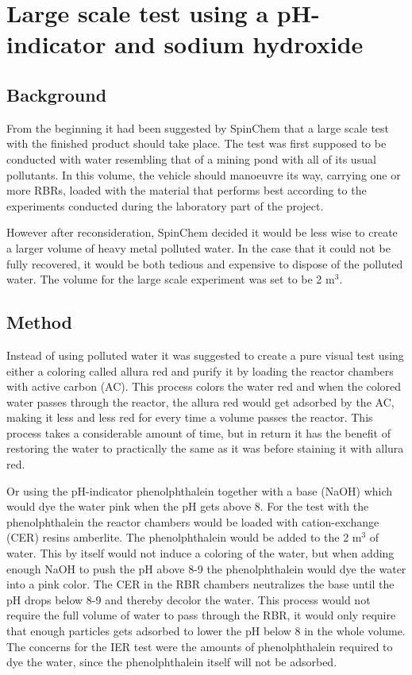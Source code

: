 \section{Large scale test using a pH-indicator and sodium hydroxide}

\subsection{Background}
From the beginning it had been suggested by SpinChem\textsuperscript{\textregistered} that a large scale test with the finished product should take place. The test was first supposed to be conducted with water resembling that of a mining pond with all of its usual pollutants. In this volume, the vehicle should manoeuvre its way, carrying one or more RBRs, loaded with the material that performs best according to the experiments conducted during the laboratory part of the project.

However after reconsideration, SpinChem\textsuperscript{\textregistered} decided it would be less wise to create a larger volume of heavy metal polluted water. In the case that it could not be fully recovered, it would be both tedious and expensive to dispose of the polluted water. The volume for the large scale experiment was set to be 2 m$^3$.

\subsection{Method}
Instead of using polluted water it was suggested to create a pure visual test using either a coloring called allura red and purify it by loading the reactor chambers with active carbon (AC). This process colors the water red and when the colored water passes through the reactor, the allura red would get adsorbed by the AC, making it less and less red for every time a volume passes the reactor. This process takes a considerable amount of time, but in return it has the benefit of restoring the water to practically the same as it was before staining it with allura red.
 
Or using the pH-indicator phenolphthalein together with a base (NaOH) which would dye the water pink when the pH gets above 8. For the test with the phenolphthalein the reactor chambers would be loaded with cation-exchange (CER) resins amberlite. The phenolphthalein would be added to the 2 m$^3$ of water. This by itself would not induce a coloring of the water, but when adding enough NaOH to push the pH above 8-9 the phenolphthalein would dye the water into a pink color. The CER in the RBR chambers neutralizes the base until the pH drops below 8-9 and thereby decolor the water. This process would not require the full volume of water to pass through the RBR, it would only require that enough particles gets adsorbed to lower the pH below 8 in the whole volume. The concerns for the IER test were the amounts of phenolphthalein required to dye the water, since the phenolphthalein itself will not be adsorbed.

